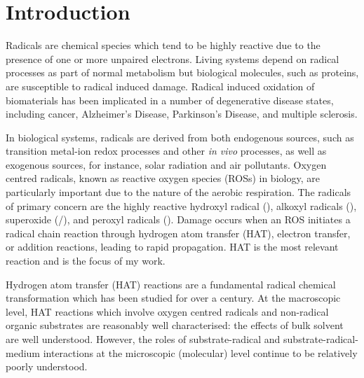 
 \chapter{Introduction}


Radicals are chemical species which tend to be highly reactive due to the
presence of one or more unpaired electrons. Living systems depend on radical
processes as part of normal metabolism but biological molecules, such as
proteins, are susceptible to radical induced damage. Radical induced oxidation
of biomaterials has been implicated in a number of degenerative disease states,
including cancer, Alzheimer's Disease, Parkinson's Disease, and multiple
sclerosis.\cite{Barnham2004,Halliwell2007,Valko2007,Hwang2013,Halliwell2015}

In biological systems, radicals are derived from both endogenous sources, such
as transition metal-ion redox processes and other \emph{in vivo} processes, as
well as exogenous sources, for instance, solar radiation and air pollutants.
Oxygen centred radicals, known as reactive oxygen species (ROSs) in biology, are
particularly important due to the nature of the aerobic respiration. The
radicals of primary concern are the highly reactive hydroxyl radical
(), alkoxyl radicals (), superoxide (/),
and peroxyl radicals ().\cite{Halliwell2015} Damage occurs when an ROS
initiates a radical chain reaction through hydrogen atom transfer (HAT),
electron transfer, or addition reactions, leading to rapid propagation. HAT is
the most relevant reaction and is the focus of my work.

Hydrogen atom transfer (HAT) reactions are a fundamental radical chemical
transformation which has been studied for over a
century.\cite{Kochi1973,Parsons2000} At the macroscopic level, HAT reactions
which involve oxygen centred radicals and non-radical organic substrates are
reasonably well characterised: the effects of bulk solvent are well
understood.\cite{Litwinienko2007} However, the roles of substrate-radical and
substrate-radical-medium interactions at the microscopic (molecular) level
continue to be relatively poorly understood.

